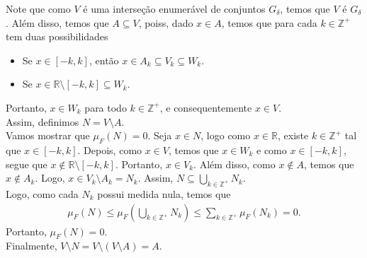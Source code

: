 \begin{homeworkProblem}[1]
\begin{solution}
\begin{itemize}
    Note que como $V$ é uma interseção enumerável de conjuntos $G_\delta$, temos que $V$ é $G_\delta$. Além disso, temos que $A\subseteq V$, poiss, dado $x\in A$, temos que para cada $k\in\mathbb{Z}^{+}$ tem duas possibilidades
    \begin{itemize}
      \item Se $x\in[-k,k]$, então $x\in A_k\subseteq V_k\subseteq W_k$.
      \item Se $x\in\mathbb{R}\setminus[-k,k]\subseteq W_k$. 
    \end{itemize}
    Portanto, $x\in W_k$ para todo $k\in\mathbb{Z}^{+}$, e consequentemente $x\in V$.\\
    Assim, definimos $N=V\setminus A$.\\
    Vamos mostrar que $\mu_F(N)=0$. Seja $x\in N$, logo como $x\in\mathbb{R}$, existe $k\in\mathbb{Z}^{+}$ tal que $x\in[-k,k]$. Depois, como $x\in V$, temos que $x\in W_k$ e como $x\in[-k,k]$, segue que $x\notin\mathbb{R}\setminus[-k,k]$. Portanto, $x\in V_k$. Além disso, como $x\notin A$, temos que $x\notin A_k$. Logo, $x\in V_k\setminus A_k=N_k$. Assim, $N\subseteq\bigcup_{k\in\mathbb{Z}^{+}}N_k$.\\
    Logo, como cada $N_k$ possui medida nula, temos que 
    \begin{align*}
      \mu_F(N)\leq\mu_F\left(\bigcup_{k\in\mathbb{Z}^{+}}N_k\right)\leq\sum_{k\in\mathbb{Z}^{+}}\mu_F(N_k)=0.    
    \end{align*}
    Portanto, $\mu_F(N)=0$.\\
    Finalmente, $V\setminus N=V\setminus(V\setminus A)=A$.\\
    

\end{itemize}
\end{solution}
\end{homeworkProblem}
